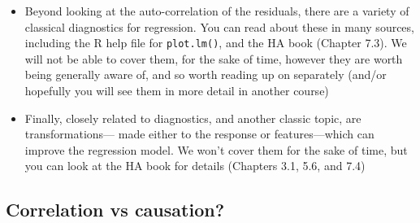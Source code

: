 \documentclass{article}
\begin{document}
\begin{itemize}
\item Beyond looking at the auto-correlation of the residuals, there are a
  variety of classical diagnostics for regression. You can read about these in 
  many sources, including the R help file for \verb|plot.lm()|, and the HA book
  (Chapter 7.3). We will not be able to cover them, for the sake of time,
  however they are worth being generally aware of, and so worth reading up on
  separately (and/or hopefully you will see them in more detail in another
  course)    

\item Finally, closely related to diagnostics, and another classic topic, are
  transformations--- made either to the response or features---which can improve
  the regression model. We won't cover them for the sake of time, but you can
  look at the HA book for details (Chapters 3.1, 5.6, and 7.4)
\end{itemize}

\subsection{Correlation vs causation?}
\end{document}

